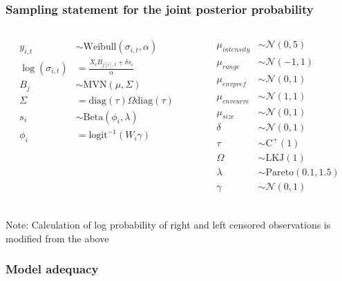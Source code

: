 \documentclass{beamer}
\begin{document}
\begin{frame}
  \frametitle{Sampling statement for the joint posterior probability}
  \begin{columns}
    \begin{column}{0.5\textwidth}
      \begin{align*}
        y_{i, t} &\sim \text{Weibull}(\sigma_{i, t}, \alpha) \\
        \log(\sigma_{i, t}) &= \frac{X_{i}B_{j[i], t} + \delta s_{i}}{\alpha} \\
        B_{j} &\sim \text{MVN}(\mu, \Sigma) \\
        \Sigma &= \text{diag}(\tau) \Omega \text{diag}(\tau) \\
        s_{i} &\sim \text{Beta}(\phi_{i}, \lambda) \\
        \phi_{i} &= \text{logit}^{-1}(W_{i}\gamma) \\
      \end{align*}
    \end{column}
    \begin{column}{0.5\textwidth}
      \begin{align*}
        \mu_{intensity} &\sim \mathcal{N}(0, 5) \\
        \mu_{range} &\sim \mathcal{N}(-1, 1) \\
        \mu_{env pref} &\sim \mathcal{N}(0, 1) \\
        \mu_{env curve} &\sim \mathcal{N}(1, 1) \\
        \mu_{size} &\sim \mathcal{N}(0, 1) \\
        \delta &\sim \mathcal{N}(0, 1) \\
        \tau &\sim \text{C}^{+}(1) \\
        \Omega &\sim \text{LKJ}(1) \\
        \lambda &\sim \text{Pareto}(0.1, 1.5) \\
        \gamma &\sim \mathcal{N}(0, 1) \\
      \end{align*}
    \end{column}
  \end{columns}

  \scriptsize{Note: Calculation of log probability of right and left censored observations is modified from the above}
\end{frame}



\begin{frame}
  \frametitle{Model adequacy}
  \begin{columns}
    \begin{column}{0.5\textwidth}
      \begin{center}
      \end{center}
    \end{column}
    \begin{column}{0.5\textwidth}
      \begin{center}
      \end{center}
    \end{column}
  \end{columns}
\end{frame}
\end{document}
